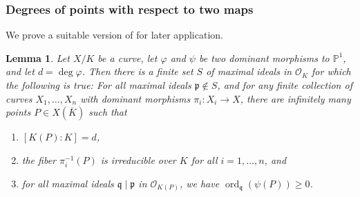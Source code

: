 \documentclass[12pt]{amsart}
\newtheorem{lem}[thm]{Lemma}
\theoremstyle{definition}
\newcommand{\bbP}{\mathbb{P}}
\newcommand{\calO}{\mathcal{O}}
\newcommand{\frakp}{\mathfrak{p}}
\newcommand{\frakq}{\mathfrak{q}}
\newcommand{\Kbar}{\overline{K}}
\newcommand{\ord}{\operatorname{ord}}
\numberwithin{equation}{section}
\begin{document}
\subsubsection{Degrees of points with respect to two maps}

We prove a suitable version of \cite[Theorem 4.2]{levin:2016} for later application.

\begin{lem}\label{lem:HIT}
    Let $X/K$ be a curve, let $\varphi$ and $\psi$ be two dominant morphisms to $\bbP^1$, and let $d = \deg\varphi$. Then there is a finite set $S$ of maximal ideals in $\calO_K$ for which the following is true: For all maximal ideals $\frakp \notin S$, and for any finite collection of curves $X_1,\ldots,X_n$ with dominant morphisms $\pi_i : X_i \to X$, there are infinitely many points $P\in X(\Kbar)$ such that
        \begin{enumerate}[label={\textup{(\roman*)}}]
        \item $[K(P) : K] = d$,
        \item the fiber $\pi_i^{-1}(P)$ is irreducible over $K$ for all $i = 1,\ldots,n$, and
        \item for all maximal ideals $\frakq\mid\frakp$ in $\calO_{K(P)}$, we have $\ord_\frakq(\psi(P)) \ge 0$.
        \end{enumerate}
\end{lem}
\end{document}
